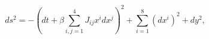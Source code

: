 \begin{equation}
\label{G5IIA}
ds^2 = - \left( dt + \beta \sum_{i,j=1}^{4} J_{ij} x^i dx^j \right)^2
+ \sum_{i=1}^8 (dx^i)^2 + dy^2,
\end{equation}

